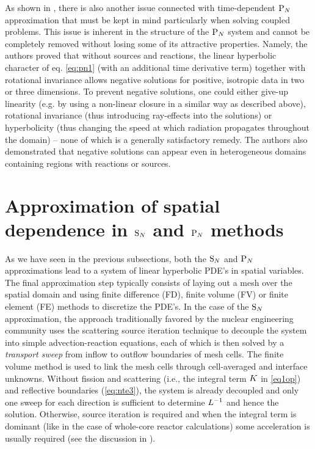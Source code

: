 As shown in \cite{McClarren4}, there is also another issue connected with time-dependent $\text{P}_{N}$ approximation that must
be kept in mind particularly when solving coupled problems. This issue is inherent in the structure of the $\text{P}_{N}$ system
and cannot be completely removed without losing some of its attractive properties. Namely, the authors proved that
without sources and reactions, the linear hyperbolic character of eq. \eqref{eq:pn1} (with an additional time derivative
term) together with rotational invariance allows negative solutions for positive, isotropic data in two or three
dimensions. To prevent negative solutions, one could either give-up linearity (e.g. by using a non-linear closure in a
similar way as described above), rotational invariance (thus introducing ray-effects into the solutions) or
hyperbolicity (thus changing the speed at which radiation propagates throughout the domain) -- none of which is a
generally satisfactory remedy. The authors also demonstrated that negative solutions can appear even in heterogeneous
domains containing regions with reactions or sources.

\section{Approximation of spatial dependence in $\text{S}_{N}$ and $\text{P}_{N}$ methods}
As we have seen in the previous subsections, both the $\text{S}_{N}$ and $\text{P}_{N}$ approximations lead to a system of linear
hyperbolic PDE's in spatial variables. The final approximation step typically consists of laying out a mesh over the
spatial domain and using finite difference (FD), finite volume (FV) or finite element (FE) methods to discretize the
PDE's. In the case of the $\text{S}_{N}$ approximation, the approach traditionally favored by the nuclear engineering community
uses the scattering source iteration technique to decouple the system into simple advection-reaction equations,
each of which is then solved by a \textit{transport sweep} from inflow to outflow boundaries of mesh cells. The finite volume method is used to link
the mesh cells through cell-averaged and interface unknowns. Without fission and scattering (i.e., the integral term
$K$ in \eqref{eq1op}) and reflective boundaries (\eqref{eq:nte3}), the system is already decoupled and only one
sweep for each direction is sufficient to determine $L^{-1}$ and hence the solution. Otherwise, source
iteration is required and when the integral term is dominant (like in the case of whole-core reactor calculations) some
acceleration is usually required (see the discussion in ).

